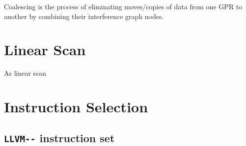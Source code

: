 \documentclass{article}
\begin{document}
Coalescing is the process of eliminating moves/copies of data from one GPR to another by combining their interference graph nodes.

\section{Linear Scan}







%
%
%
%
%
%

As linear scan 


\section{Instruction Selection}



\subsection{\lstinline!LLVM--! instruction set}
\end{document}

